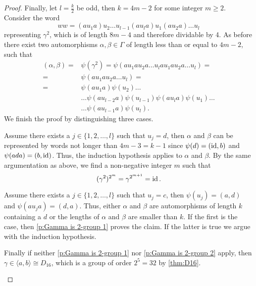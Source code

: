 \begin{proof}
Finally, let $l=\frac{k}{2}$ be odd, then $k=4m-2$ for some integer $m\geq 2$. Consider the word
\begin{equation*}
ww=(au_1 a) u_2 \ldots u_{l-1}(au_la)u_1 (a u_2 a)\ldots u_l
\end{equation*}
representing $\gamma^2$, which is of length $8m-4$ and therefore dividable by 4. As before there exist two automorphisms $\alpha,\beta\in\Gamma$ of length less than or equal to $4m-2$, such that
\begin{align*}
(\alpha,\beta)=&\psi(\gamma^2)=\psi(au_1 a u_2 a\ldots u_lau_1 a u_2 a\ldots u_l)=\\
	=&\psi(au_1 a u_2 a\ldots u_l)=\\
	=&\psi(au_1 a)\psi(u_2)\ldots\\
	&\ldots\psi(au_{l-2}a)\psi(u_{l-1})\psi(au_l a)\psi(u_1)\ldots\\
	&\ldots\psi(au_{l-1}a)\psi(u_l).
\end{align*}
We finish the proof by distinguishing three cases.
\begin{clist}
\item \label{p:Gamma is 2-group 1} Assume there exists a $j\in\lbrace 1,2,\ldots,l\rbrace$ such that $u_j=d$, then $\alpha$ and $\beta$ can be represented by words not longer than $4m-3=k-1$ since $\psi(d)=(\operatorname{id},b)$ and $\psi(ada)=(b,\operatorname{id})$. Thus, the induction hypothesis applies to $\alpha$ and $\beta$. By the same argumentation as above, we find a non-negative integer $m$ such that 
\begin{equation*}
(\gamma^2)^{2^m}=\gamma^{2^{m+1}}=\operatorname{id}.
\end{equation*}
\item \label{p:Gamma is 2-group 2} Assume there exists a $j\in\lbrace 1,2,\ldots,l\rbrace$ such that $u_j=c$, then $\psi(u_j)=(a,d)$ and $\psi(au_ja)=(d,a)$. Thus,  either $\alpha$ and $\beta$ are automorphisms of length $k$ containing a $d$ or the lengths of $\alpha$ and $\beta$ are smaller than $k$. If the first is the case, then \ref{p:Gamma is 2-group 1} proves the claim. If the latter is true we argue with the induction hypothesis.
\item Finally if neither \ref{p:Gamma is 2-group 1} nor \ref{p:Gamma is 2-group 2} apply, then $\gamma\in\langle a,b\rangle\cong D_{16}$, which is a group of order $2^5=32$ by \cref{thm:D16}.
\end{clist}
\end{proof}